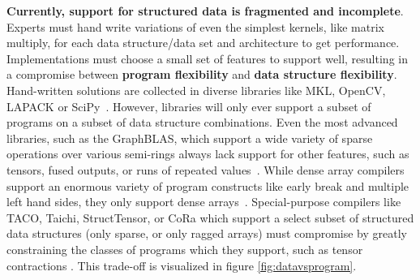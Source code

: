 %
\textbf{Currently, support for structured data is fragmented and incomplete}.
%
Experts must hand write variations of even the simplest kernels, like matrix
multiply, for each data structure/data set and architecture to get performance.
%
Implementations must choose a small set of features to support well, resulting
in a compromise between \textbf{program flexibility} and \textbf{data structure
flexibility}.
%
Hand-written solutions are collected in diverse libraries like
MKL, OpenCV, LAPACK or SciPy~\cite{ bradski2000opencv, anderson1999lapack, virtanen2020scipy, psarras2022linear}. 
%
However, libraries will only ever support a subset of
programs on a subset of data structure combinations.
%
Even the most advanced
libraries, such as the GraphBLAS, which support a wide variety of sparse
operations over various semi-rings always lack support for other features, such
as tensors, fused outputs, or runs of repeated values~\cite{bulucc2017design, mattson2019lagraph}.
%
While dense array
compilers support an enormous variety of program constructs like early break and
multiple left hand sides, they only support dense arrays~\cite{ragan-kelley_halide_2013,grosser2012polly}.  
%
Special-purpose
compilers like TACO, Taichi, StructTensor, or CoRa which support a select subset of structured data
structures (only sparse, or only ragged arrays) must compromise by greatly
constraining the classes of programs which they support, such as tensor
contractions \cite{kjolstad_tensor_2019, hu_taichi_2019, ghorbani2023compiling, fegade_cora_2022}. 
%
This trade-off is
visualized in figure \ref{fig:datavsprogram}.

